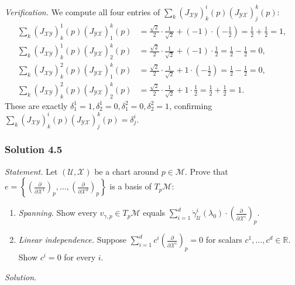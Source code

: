 \documentclass[11pt]{article}
\begin{document}
\emph{Verification.} We compute all four entries of
$\sum_k(J_{\mathcal{XY}})^i_k(p)(J_{\mathcal{YX}})^k_j(p)$:
\begin{align*}
\sum_k(J_{\mathcal{XY}})^1_k(p)(J_{\mathcal{YX}})^k_1(p) &=
\frac{\sqrt2}{2}\cdot\frac{1}{\sqrt2} + (-1)\cdot\left(-\frac12\right) =
\frac12+\frac12 = 1,\\
\sum_k(J_{\mathcal{XY}})^1_k(p)(J_{\mathcal{YX}})^k_2(p) &=
\frac{\sqrt2}{2}\cdot\frac{1}{\sqrt2} + (-1)\cdot\frac12 = \frac12-\frac12
= 0,\\
\sum_k(J_{\mathcal{XY}})^2_k(p)(J_{\mathcal{YX}})^k_1(p) &=
\frac{\sqrt2}{2}\cdot\frac{1}{\sqrt2} + 1\cdot\left(-\frac12\right) =
\frac12-\frac12 = 0,\\
\sum_k(J_{\mathcal{XY}})^2_k(p)(J_{\mathcal{YX}})^k_2(p) &=
\frac{\sqrt2}{2}\cdot\frac{1}{\sqrt2} + 1\cdot\frac12 = \frac12+\frac12 =
1.
\end{align*}
These are exactly $\delta^1_1=1,\delta^1_2=0,\delta^2_1=0,\delta^2_2=1$,
confirming $\sum_k(J_{\mathcal{XY}})^i_k(p)(J_{\mathcal{YX}})^k_j(p)=
\delta^i_j$.

\subsubsection*{Solution 4.5}

\noindent\textit{Statement.} Let $(\mathcal U,\mathcal X)$ be a chart
around $p\in\mathcal M$. Prove that $e=\left\{\left(\frac{\partial}{\partial
\mathcal X^1}\right)_p,\dots,\left(\frac{\partial}{\partial\mathcal
X^d}\right)_p\right\}$ is a basis of $T_p\mathcal M$:
\begin{enumerate}[label=(\alph*)]
  \item \emph{Spanning.} Show every $v_{\gamma,p}\in T_p\mathcal M$ equals
  $\sum_{i=1}^d\dot\gamma^i_{\mathcal U}(\lambda_0)\cdot\left(
  \frac{\partial}{\partial\mathcal X^i}\right)_p$.
  \item \emph{Linear independence.} Suppose $\sum_{i=1}^d
  c^i\left(\frac{\partial}{\partial\mathcal X^i}\right)_p=0$ for scalars
  $c^1,\dots,c^d\in\mathbb R$. Show $c^i=0$ for every $i$.
\end{enumerate}

\medskip
\noindent\textit{Solution.}
\end{document}
